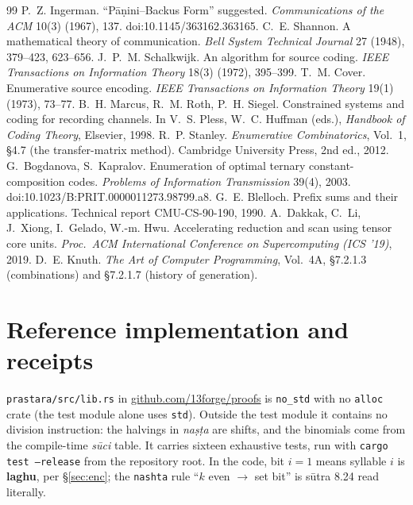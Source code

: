 \documentclass[11pt,letterpaper]{article}
\newcommand{\skt}[1]{\textit{#1}}
\newcommand{\code}[1]{\texttt{#1}}
\theoremstyle{plain}
\theoremstyle{remark}
\begin{document}
\begin{thebibliography}{99}
 P.~Z. Ingerman. ``Pāṇini--Backus Form'' suggested. \emph{Communications of the ACM} 10(3) (1967), 137. doi:10.1145/363162.363165.
 C.~E. Shannon. A mathematical theory of communication. \emph{Bell System Technical Journal} 27 (1948), 379--423, 623--656.
 J.~P.~M. Schalkwijk. An algorithm for source coding. \emph{IEEE Transactions on Information Theory} 18(3) (1972), 395--399.
 T.~M. Cover. Enumerative source encoding. \emph{IEEE Transactions on Information Theory} 19(1) (1973), 73--77.
 B.~H. Marcus, R.~M. Roth, P.~H. Siegel. Constrained systems and coding for recording channels. In V.~S. Pless, W.~C. Huffman (eds.), \emph{Handbook of Coding Theory}, Elsevier, 1998.
 R.~P. Stanley. \emph{Enumerative Combinatorics}, Vol.~1, §4.7 (the transfer-matrix method). Cambridge University Press, 2nd ed., 2012.
 G.~Bogdanova, S.~Kapralov. Enumeration of optimal ternary constant-composition codes. \emph{Problems of Information Transmission} 39(4), 2003. doi:10.1023/B:PRIT.0000011273.98799.a8.
 G.~E. Blelloch. Prefix sums and their applications. Technical report CMU-CS-90-190, 1990.
 A.~Dakkak, C.~Li, J.~Xiong, I.~Gelado, W.-m. Hwu. Accelerating reduction and scan using tensor core units. \emph{Proc.\ ACM International Conference on Supercomputing (ICS '19)}, 2019.
 D.~E. Knuth. \emph{The Art of Computer Programming}, Vol.~4A, §7.2.1.3 (combinations) and §7.2.1.7 (history of generation).
\end{thebibliography}

\clearpage
\appendix
\section{Reference implementation and receipts}\label{app:receipts}

\code{prastara/src/lib.rs} in \href{https://github.com/13forge/proofs}{github.com/13forge/proofs} is \code{no\_std} with no \code{alloc} crate (the test module alone uses \code{std}). Outside the test module it contains no division instruction: the halvings in \skt{naṣṭa} are shifts, and the binomials come from the compile-time \skt{sūci} table. It carries sixteen exhaustive tests, run with \code{cargo test --release} from the repository root. In the code, bit $i = 1$ means syllable $i$ is \textbf{laghu}, per §\ref{sec:enc}; the \code{nashta} rule ``$k$ even $\to$ set bit'' is sūtra 8.24 read literally.
\end{document}

